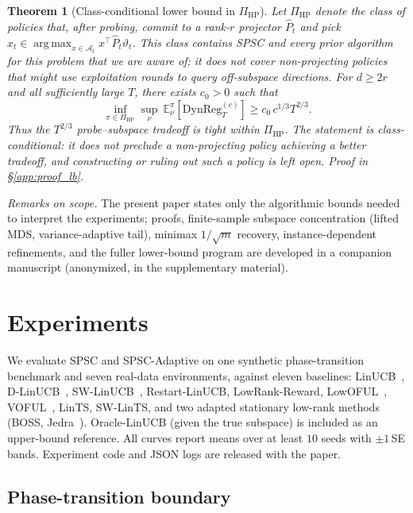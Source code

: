 \documentclass{article}
\newcommand{\E}{\mathbb{E}}
\newcommand{\cA}{\mathcal{A}}
\newcommand{\DynReg}{\mathrm{DynReg}}
\DeclareMathOperator*{\argmax}{arg\,max}
\newtheorem{theorem}{Theorem}
\begin{document}
\begin{theorem}[Class-conditional lower bound in $\Pi_{\mathrm{HP}}$]
\label{thm:spsc_lb}
Let $\Pi_{\mathrm{HP}}$ denote the class of policies that, after
probing, commit to a rank-$r$ projector $\widehat P_t$ and pick
$x_t\in\argmax_{x\in\cA_t} x^\top \widehat P_t \vartheta_t$. This
class contains SPSC and every prior algorithm for this problem that
we are aware of; it does \emph{not} cover non-projecting policies
that might use exploitation rounds to query off-subspace directions.
For $d\ge 2r$ and all sufficiently large $T$, there
exists $c_0 > 0$ such that
\[
\inf_{\pi\in\Pi_{\mathrm{HP}}} \sup_\nu\ \E^\pi_\nu[\DynReg_T^{(c)}]
 \ge c_0\,c^{1/3}T^{2/3}.
\]
Thus the $T^{2/3}$ probe--subspace tradeoff is tight \emph{within}
$\Pi_{\mathrm{HP}}$. The statement is class-conditional: it does not
preclude a non-projecting policy achieving a better tradeoff, and
constructing or ruling out such a policy is left open.
Proof in \S\ref{app:proof_lb}.
\end{theorem}

\emph{Remarks on scope.} The present paper states only the algorithmic
bounds needed to interpret the experiments; proofs, finite-sample
subspace concentration (lifted MDS, variance-adaptive tail),
minimax $1/\sqrt{m}$ recovery, instance-dependent refinements, and
the fuller lower-bound program are developed in a companion
manuscript (anonymized, in the supplementary material).

\section{Experiments}
\label{sec:experiments}

We evaluate SPSC and SPSC-Adaptive on one synthetic phase-transition
benchmark and seven real-data environments, against eleven baselines:
LinUCB~\citep{abbasi2011improved}, D-LinUCB~\citep{russac2019weighted},
SW-LinUCB~\citep{cheung2019learning}, Restart-LinUCB,
LowRank-Reward, LowOFUL~\citep{jun2019bilinear},
VOFUL~\citep{kim2022improved}, LinTS,
SW-LinTS, and two adapted stationary low-rank methods (BOSS,
Jedra~\citep{pmlr-v235-jedra24a}). Oracle-LinUCB (given the
true subspace) is included as an upper-bound reference. All curves
report means over at least $10$ seeds with $\pm 1$\,SE bands.
Experiment code and JSON logs are released with the paper.

\subsection{Phase-transition boundary}
\label{sec:exp_phase}
\end{document}
